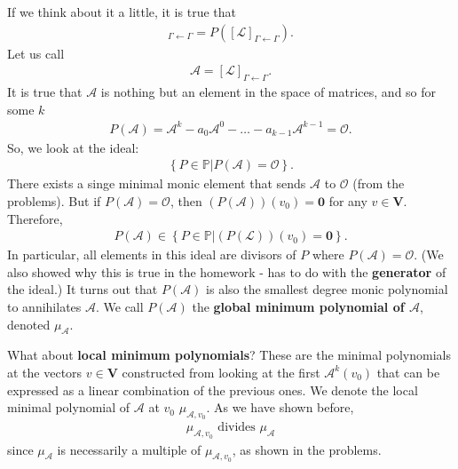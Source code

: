 \documentclass{article}
\theoremstyle{definition}
\newcommand{\V}{\mathbf{V}}
\newcommand{\A}{\mathcal{A}}
\newcommand{\lag}{\mathcal{L}}
\begin{document}
	If we think about it a little, it is true that
\begin{align*}
[P(\lag)]_{\Gamma\leftarrow\Gamma} = P\left([\lag]_{\Gamma\leftarrow\Gamma}\right).
\end{align*}
Let us call 
\begin{align*}
\mathcal{A} = [\lag]_{\Gamma\leftarrow\Gamma}.
\end{align*}
It is true that $\mathcal{A}$ is nothing but an element in the space of matrices, and so for some $k$
\begin{align*}
P(\A) = \A^k - a_0 \A^{0} - \dots - a_{k-1}\A^{k-1} = \mathcal{O}.
\end{align*}
So, we look at the ideal:
\begin{align*}
\left\{ P \in \mathbb{P} \bigg\vert P(\A) = \mathcal{O} \right\}.
\end{align*}
There exists a singe minimal monic element that sends $\A$ to $\mathcal{O}$ (from the problems). But if $P(\A) = \mathcal{O}$, then $(P(\A))(v_0) = \mathbf{0}$ for any $v\in \V$. Therefore,
\begin{align*}
P(\A) \in 
\left\{ 
P \in \mathbb{P} 
\bigg\vert
(P(\lag))(v_0) = \mathbf{0}  
\right\} .
\end{align*}
In particular, all elements in this ideal are divisors of $P$ where $P(\A) = \mathcal{O}$. (We also showed why this is true in the homework - has to do with the \textbf{generator} of the ideal.) It turns out that $P(\A)$ is also the smallest degree monic polynomial to annihilates $\A$. We call $P(\A)$ the \textbf{global minimum polynomial of $\A$}, denoted $\mu_\A$.

What about \textbf{local minimum polynomials}? These are the minimal polynomials at the vectors $v\in \V$ constructed from looking at the first $\A^k(v_0)$ that can be expressed as a linear combination of the previous ones. We denote the local minimal polynomial of $\A$ at $v_0$ $\mu_{\A,v_0}$. As we have shown before,
\begin{align*}
\boxed{\mu_{\A,v_0} \text{ divides } \mu_\A}
\end{align*}  
since $\mu_\A$ is necessarily a multiple of $\mu_{\A,v_0}$, as shown in the problems. \\
\end{document}
